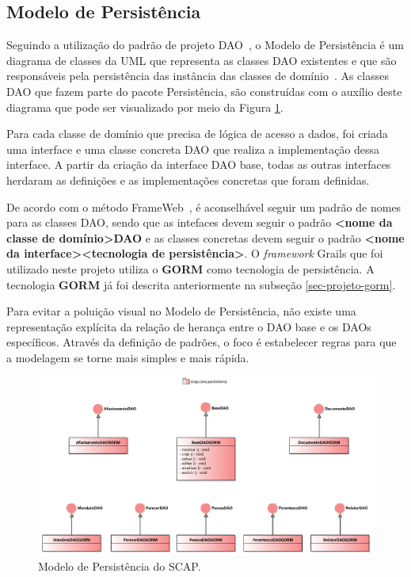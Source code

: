 \subsection{Modelo de Persistência}
\label{sec-projeto-modelo-persistencia}

Seguindo a utilização do padrão de projeto DAO~\cite{alur-et-al:bpds03}, o Modelo de Persistência é um diagrama de classes da UML que representa as classes DAO existentes e que são responsáveis pela persistência das instância das classes de domínio~\cite{souza:masterthesis07}. As classes DAO que fazem parte do pacote Persistência, são construídas com o auxílio deste diagrama que pode ser visualizado por meio da Figura \ref{fig-projeto-persistencia}.

Para cada classe de domínio que precisa de lógica de acesso a dados, foi criada uma interface e uma classe concreta DAO que realiza a implementação dessa interface. A partir da criação da interface DAO base, todas as outras interfaces herdaram as definições e as implementações concretas que foram definidas.

De acordo com o método FrameWeb~\cite{souza:masterthesis07,souza-celebratingfalbo20}, é aconselhável seguir um padrão de nomes para as classes DAO, sendo que as intefaces devem seguir o padrão \textbf{<nome da classe de domínio>DAO} e as classes concretas devem seguir o padrão \textbf{<nome da interface><tecnologia de persistência>}. O \textit{framework} Grails que foi utilizado neste projeto utiliza o \textbf{GORM} como tecnologia de persistência. A tecnologia \textbf{GORM} já foi descrita anteriormente na subseção \ref{sec-projeto-gorm}.

Para evitar a poluição visual no Modelo de Persistência, não existe uma representação explícita da relação de herança entre o DAO base e os DAOs específicos. Através da definição de padrões, o foco é estabelecer regras para que a modelagem se torne mais simples e mais rápida.    

\begin{figure}[h]
	\centering
	\includegraphics[scale=0.4]{figuras/fig-projeto-persistencia} 
	\caption{Modelo de Persistência do SCAP.}
	\label{fig-projeto-persistencia}
\end{figure}

